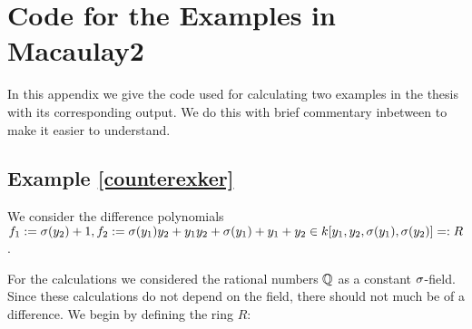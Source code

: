 



\section{Code for the Examples in Macaulay2}\label{appendixcode}

In this appendix we give the code used for calculating two examples in the thesis with its corresponding output. We do this with brief commentary inbetween to make it easier to understand.

\subsection{Example \ref{counterexker}}
We consider the difference polynomials $f_1 := \sigma(y_2) + 1, f_2:= \sigma(y_1)y_2 + y_1y_2 + \sigma(y_1) + y_1 + y_2 \in k[y_1,y_2,\sigma(y_1),\sigma(y_2)] =: R$.

For the calculations we considered the rational numbers $\mathbb{Q}$ as a constant $\sigma$-field. Since these calculations do not depend on the field, there should not much be of a difference. We begin by defining the ring $R$:

